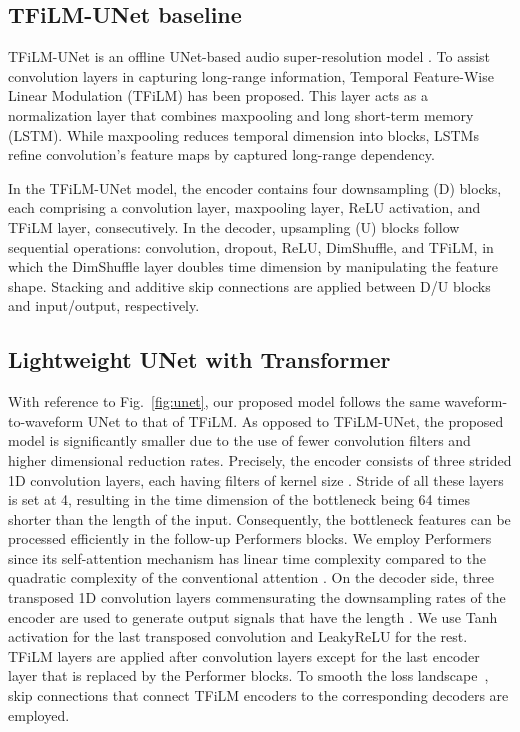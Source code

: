 \documentclass{article}
\begin{document}
\subsection{TFiLM-UNet baseline}
TFiLM-UNet is an offline UNet-based audio super-resolution model \cite{birnbaum2021temporal}. To assist convolution layers in capturing long-range information, Temporal Feature-Wise Linear Modulation (TFiLM) has been proposed. This layer acts as a normalization layer that combines maxpooling and long short-term memory (LSTM). While maxpooling reduces temporal dimension into  blocks, LSTMs refine convolution's feature maps by captured long-range dependency.

In the TFiLM-UNet model, the encoder contains four downsampling (D) blocks, each comprising a convolution layer, maxpooling layer, ReLU activation, and TFiLM layer, consecutively. In the decoder, upsampling (U) blocks follow sequential operations: convolution, dropout, ReLU, DimShuffle, and TFiLM, in which the DimShuffle layer doubles time dimension by manipulating the feature shape. Stacking and additive skip connections are applied between D/U blocks and input/output, respectively.
\vspace{-0.2cm}
\subsection{Lightweight UNet with Transformer}

With reference to Fig.~\ref{fig:unet}, our proposed model follows the same waveform-to-waveform UNet to that of TFiLM. As opposed to TFiLM-UNet, the proposed model is significantly smaller due to the use of fewer convolution filters and higher dimensional reduction rates. Precisely, the encoder consists of three strided 1D convolution layers, each having  filters of kernel size . Stride  of all these layers is set at 4, resulting in the time dimension of the bottleneck being 64 times shorter than the length  of the input. Consequently, the bottleneck features can be processed efficiently in the follow-up Performers \cite{choromanski2021rethinking} blocks. We employ Performers since its self-attention mechanism has linear time complexity compared to the quadratic complexity of the conventional attention \cite{vaswani2017attention}. On the decoder side, three transposed 1D convolution layers commensurating the downsampling rates of the encoder are used to generate output signals that have the length . We use Tanh activation for the last transposed convolution and LeakyReLU \cite{Maas2013RectifierNI} for the rest. TFiLM layers are applied after convolution layers except for the last encoder layer that is replaced by the Performer blocks. To smooth the loss landscape~\cite{Wang2020IsTS}, skip connections that connect TFiLM encoders to the corresponding decoders are employed.
\end{document}
